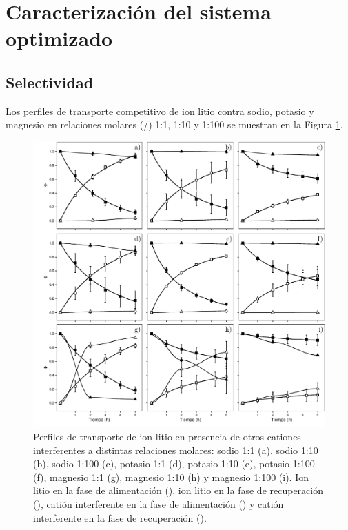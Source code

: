 \section{Caracterización del sistema optimizado}
\subsection{Selectividad}\label{sec:selecresults}
Los perfiles de transporte competitivo de ion litio contra sodio, potasio y magnesio en relaciones molares (/) 1:1, 1:10 y 1:100 se muestran en la Figura \ref{fig:selectivity1}.

\begin{figure}[H]
    \centering
    \includegraphics[width=\textwidth]{chap5/figures/thesis-selectividad.pdf}
    \caption[Perfiles de transporte competitivo de ion litio contra sodio, potasio y magnesio.]{Perfiles de transporte de ion litio en presencia de otros cationes interferentes a distintas relaciones molares: sodio 1:1 (a), sodio 1:10 (b), sodio 1:100 (c), potasio 1:1 (d), potasio 1:10 (e), potasio 1:100 (f), magnesio 1:1 (g),  magnesio 1:10 (h) y magnesio 1:100 (i). Ion litio en la fase de alimentación (\protect\squareblck), ion litio en la fase de recuperación (\protect\squarewht), catión interferente en la fase de alimentación (\protect\triangleupblck) y catión interferente en la fase de recuperación (\protect\triangleupwht).}
    \label{fig:selectivity1}
\end{figure}

